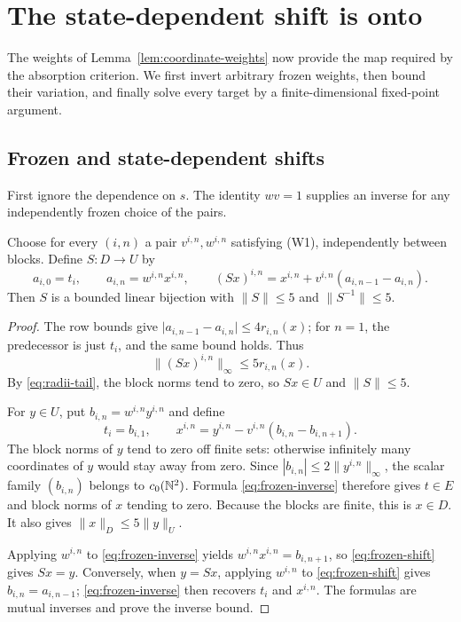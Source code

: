 \section{The state-dependent shift is onto}\label{sec:shift}

The weights of Lemma~\ref{lem:coordinate-weights} now provide the
map required by the absorption criterion. We first invert arbitrary
frozen weights, then bound their variation, and finally solve every
target by a finite-dimensional fixed-point argument.

\subsection{Frozen and state-dependent shifts}

First ignore the dependence on \(s\). The identity \(wv=1\) supplies
an inverse for any independently frozen choice of the pairs.

\begin{lemma}\label{lem:frozen}
Choose for every \((i,n)\) a pair \(v^{i,n},w^{i,n}\) satisfying
(W1), independently between blocks. Define \(S:D\to U\) by
\begin{equation}
 a_{i,0}=t_i,\qquad a_{i,n}=w^{i,n}x^{i,n},\qquad
 (Sx)^{i,n}=x^{i,n}+v^{i,n}(a_{i,n-1}-a_{i,n}).               \label{eq:frozen-shift}
\end{equation}
Then \(S\) is a bounded linear bijection with
\(\|S\|\leq5\) and \(\|S^{-1}\|\leq5\).
\end{lemma}

\begin{proof}
The row bounds give
\(\lvert a_{i,n-1}-a_{i,n}\rvert\leq4r_{i,n}(x)\);
for \(n=1\), the predecessor is just \(t_i\), and the same bound
holds. Thus
\[
                    \|(Sx)^{i,n}\|_\infty\leq5r_{i,n}(x).
\]
By \eqref{eq:radii-tail}, the block norms tend to zero, so \(Sx\in U\) and
\(\|S\|\leq5\).

For \(y\in U\), put \(b_{i,n}=w^{i,n}y^{i,n}\) and define
\begin{equation}
 t_i=b_{i,1},\qquad
 x^{i,n}=y^{i,n}-v^{i,n}(b_{i,n}-b_{i,n+1}).                  \label{eq:frozen-inverse}
\end{equation}
The block norms of \(y\) tend to zero off finite sets: otherwise
infinitely many coordinates of \(y\) would stay away from zero.
Since \(|b_{i,n}|\leq2\|y^{i,n}\|_\infty\), the scalar family
\((b_{i,n})\) belongs to \(c_0(\mathbb N^2)\). Formula \eqref{eq:frozen-inverse} therefore gives
\(t\in E\) and block norms of \(x\) tending to zero. Because the
blocks are finite, this is \(x\in D\). It also gives
\(\|x\|_D\leq5\|y\|_U\).

Applying \(w^{i,n}\) to \eqref{eq:frozen-inverse} yields
\(w^{i,n}x^{i,n}=b_{i,n+1}\), so \eqref{eq:frozen-shift} gives \(Sx=y\).
Conversely, when \(y=Sx\), applying \(w^{i,n}\) to \eqref{eq:frozen-shift} gives
\(b_{i,n}=a_{i,n-1}\); \eqref{eq:frozen-inverse} then recovers \(t_i\) and \(x^{i,n}\).
The formulas are mutual inverses and prove the inverse bound.
\end{proof}

